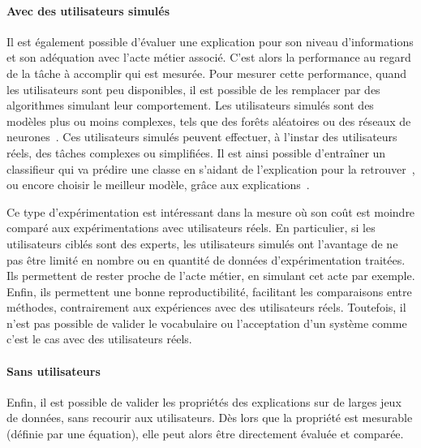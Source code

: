 \paragraph{Avec des utilisateurs simulés}
Il est également possible d'évaluer une explication pour son niveau d'informations et son adéquation avec l'acte métier associé. C'est alors la performance au regard de la tâche à accomplir qui est mesurée.
Pour mesurer cette performance, quand les utilisateurs sont peu disponibles, il est possible de les remplacer par des algorithmes simulant leur comportement.
Les utilisateurs simulés sont des modèles plus ou moins complexes, tels que des forêts aléatoires ou des réseaux de neurones~\cite{Ribeiro2018}. Ces utilisateurs simulés peuvent effectuer, à l'instar des utilisateurs réels, des tâches complexes ou simplifiées. Il est ainsi possible d'entraîner un classifieur qui va prédire une classe en s'aidant de l'explication pour la retrouver~\cite{Ribeiro2016, Ribeiro2018, Dhurandhar2017}, ou encore choisir le meilleur modèle, grâce aux explications~\cite{Ribeiro2016}.

Ce type d'expérimentation est intéressant dans la mesure où son coût est moindre comparé aux expérimentations avec utilisateurs réels. En particulier, si les utilisateurs ciblés sont des experts, les utilisateurs simulés ont l'avantage de ne pas être limité en nombre ou en quantité de données d'expérimentation traitées. Ils permettent de rester proche de l'acte métier, en simulant cet acte par exemple. Enfin, ils permettent une bonne reproductibilité, facilitant les comparaisons entre méthodes, contrairement aux expériences avec des utilisateurs réels.
Toutefois, il n'est pas possible de valider le vocabulaire ou l'acceptation d'un système comme c'est le cas avec des utilisateurs réels.

\paragraph{Sans utilisateurs} \label{C1:no_user}

Enfin, il est possible de valider les propriétés des explications sur de larges jeux de données, sans recourir aux utilisateurs. Dès lors que la propriété est mesurable (définie par une équation), elle peut alors être directement évaluée et comparée.

